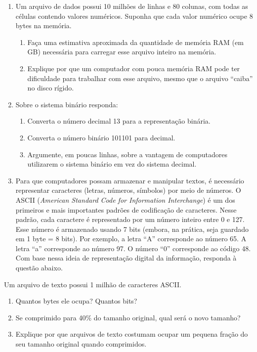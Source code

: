 \documentclass[
  brazilian,
  letterpaper,
  DIV=11,
  numbers=noendperiod]{scrreprt}
\providecommand{\tightlist}{%
  \setlength{\itemsep}{0pt}\setlength{\parskip}{0pt}}
\begin{document}
\begin{enumerate}
\def\labelenumi{\arabic{enumi}.}
\tightlist
\item
  Um arquivo de dados possui 10 milhões de linhas e 80 colunas, com
  todas as células contendo valores numéricos. Suponha que cada valor
  numérico ocupe 8 bytes na memória.

  \begin{enumerate}
  \def\labelenumii{\alph{enumii}.}
  \tightlist
  \item
    Faça uma estimativa aproximada da quantidade de memória RAM (em GB)
    necessária para carregar esse arquivo inteiro na memória.
  \item
    Explique por que um computador com pouca memória RAM pode ter
    dificuldade para trabalhar com esse arquivo, mesmo que o arquivo
    ``caiba'' no disco rígido.
  \end{enumerate}
\item
  Sobre o sistema binário responda:

  \begin{enumerate}
  \def\labelenumii{\alph{enumii}.}
  \tightlist
  \item
    Converta o número decimal 13 para a representação binária.
  \item
    Converta o número binário 101101 para decimal.
  \item
    Argumente, em poucas linhas, sobre a vantagem de computadores
    utilizarem o sistema binário em vez do sistema decimal.
  \end{enumerate}
\item
  Para que computadores possam armazenar e manipular textos, é
  necessário representar caracteres (letras, números, símbolos) por meio
  de números. O ASCII (\emph{American Standard Code for Information
  Interchange}) é um dos primeiros e mais importantes padrões de
  codificação de caracteres. Nesse padrão, cada caractere é representado
  por um número inteiro entre 0 e 127. Esse número é armazenado usando 7
  bits (embora, na prática, seja guardado em 1 byte = 8 bits). Por
  exemplo, a letra ``A'' corresponde ao número 65. A letra ``a''
  corresponde ao número 97. O número ``0'' corresponde ao código 48. Com
  base nessa ideia de representação digital da informação, responda à
  questão abaixo.
\end{enumerate}

Um arquivo de texto possui 1 milhão de caracteres ASCII.

\begin{enumerate}
\def\labelenumi{\alph{enumi}.}
\tightlist
\item
  Quantos bytes ele ocupa? Quantos bits?
\item
  Se comprimido para 40\% do tamanho original, qual será o novo tamanho?
\item
  Explique por que arquivos de texto costumam ocupar um pequena fração
  do seu tamanho original quando comprimidos.
\end{enumerate}
\end{document}
